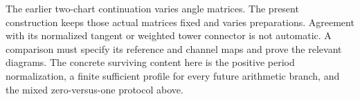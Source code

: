 The earlier two-chart continuation varies angle matrices. The present
construction keeps those actual matrices fixed and varies preparations.
Agreement with its normalized tangent or weighted tower connector is not
automatic. A comparison must specify its reference and channel maps and
prove the relevant diagrams. The concrete surviving content here is the
positive period normalization, a finite sufficient profile for every future
arithmetic branch, and the mixed zero-versus-one protocol above.
